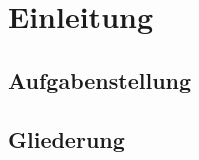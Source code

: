 %


\chapter{Einleitung}
\label{cha:Einleitung} 


\section{Aufgabenstellung}
\label{sec:Aufgabenstellung}



\section{Gliederung}
\label{sec:Gliederung}





